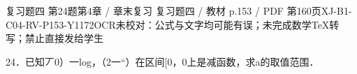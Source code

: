 \begin{bankitem}{复习题四 第24题}{第4章 / 章末复习 复习题四 / 教材 p.153 / PDF 第160页}{XJ-B1-C04-RV-P153-Y1172}{OCR未校对：公式与文字均可能有误；未完成数学TeX转写；禁止直接发给学生}
\begin{ocrdraft}
\par
24．已知丆0）一log，（2一“）在区间[0，0上是减函数，求a的取值范围．
\end{ocrdraft}
\end{bankitem}
